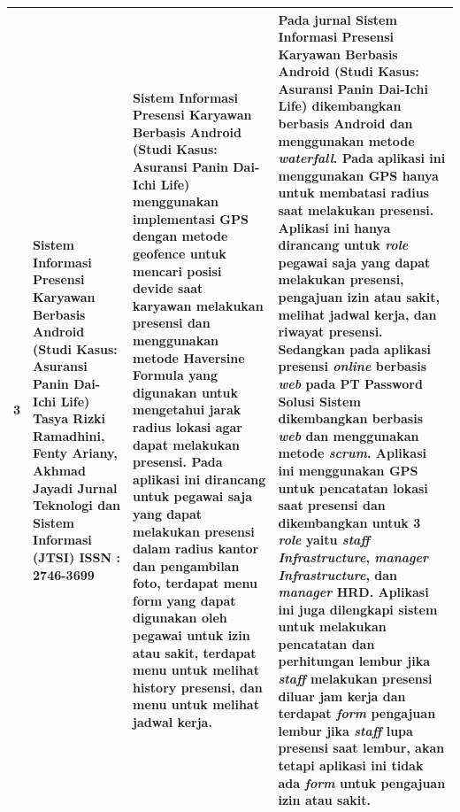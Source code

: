 \begin{longtable}{ |p{0.5cm}|p{3cm}|p{7cm}|p{12cm}|  }
  3 & Sistem Informasi Presensi Karyawan Berbasis Android (Studi Kasus: Asuransi Panin Dai-Ichi Life)
 \newline Tasya Rizki Ramadhini, Fenty Ariany, Akhmad Jayadi
 \newline Jurnal Teknologi dan Sistem Informasi (JTSI)
 \newline ISSN : 2746-3699
 & Sistem Informasi Presensi Karyawan Berbasis Android (Studi Kasus: Asuransi Panin Dai-Ichi Life) menggunakan implementasi GPS dengan metode geofence untuk mencari posisi devide saat karyawan melakukan presensi dan menggunakan metode Haversine Formula yang digunakan untuk mengetahui jarak radius lokasi agar dapat melakukan presensi. Pada aplikasi ini dirancang untuk pegawai saja yang dapat melakukan presensi dalam radius kantor dan pengambilan foto, terdapat menu form yang dapat digunakan oleh pegawai untuk izin atau sakit, terdapat menu untuk melihat history presensi, dan menu untuk melihat jadwal kerja.
 & Pada jurnal Sistem Informasi Presensi Karyawan Berbasis Android (Studi Kasus: Asuransi Panin Dai-Ichi Life) dikembangkan berbasis Android dan menggunakan metode \textit{waterfall}. Pada aplikasi ini menggunakan GPS hanya untuk membatasi radius saat melakukan presensi. Aplikasi ini hanya dirancang untuk \textit{role} pegawai saja yang dapat melakukan presensi, pengajuan izin atau sakit, melihat jadwal kerja, dan riwayat presensi.
 \newline 
  \newline
  Sedangkan pada aplikasi presensi \textit{online} berbasis \textit{web} pada PT Password Solusi Sistem dikembangkan berbasis \textit{web} dan menggunakan metode \textit{scrum}. Aplikasi ini menggunakan GPS untuk pencatatan lokasi saat presensi dan dikembangkan untuk 3 \textit{role} yaitu \textit{staff Infrastructure}, \textit{manager Infrastructure}, dan \textit{manager} HRD. Aplikasi ini juga dilengkapi sistem untuk melakukan pencatatan dan perhitungan lembur jika \textit{staff} melakukan presensi diluar jam kerja dan terdapat \textit{form} pengajuan lembur jika \textit{staff} lupa presensi saat lembur, akan tetapi aplikasi ini tidak ada \textit{form} untuk pengajuan izin atau sakit.
 \\ \hline


\end{longtable}
